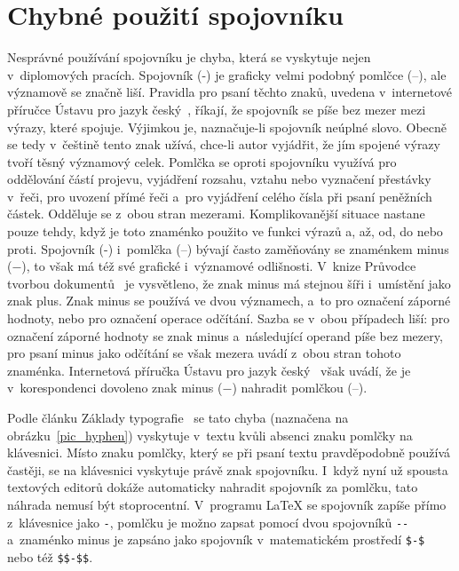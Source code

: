 \section{Chybné použití spojovníku}
Nesprávné používání spojovníku je chyba, která se vyskytuje nejen v~diplomových
pracích. Spojovník (-) je graficky velmi podobný pomlčce (--), ale významově
se značně liší. Pravidla pro psaní těchto znaků, uvedena v~internetové příručce
Ústavu pro jazyk český~\cite[Sekce: \emph{Spojovník} a~\emph{Pomlčka}]{Ustav_pro_jazyk_cesky},
říkají, že spojovník se píše bez mezer mezi výrazy, které spojuje. Výjimkou
je, naznačuje-li spojovník neúplné slovo. Obecně se tedy v~češtině tento znak
užívá, chce-li autor vyjádřit, že jím spojené výrazy tvoří těsný významový
celek. Pomlčka se oproti spojovníku využívá pro oddělování částí projevu,
vyjádření rozsahu, vztahu nebo vyznačení přestávky v~řeči, pro uvození
přímé řeči a~pro vyjádření celého čísla při psaní peněžních částek.
Odděluje se z~obou stran mezerami. Komplikovanější situace nastane pouze
tehdy, když je toto znaménko použito ve funkci výrazů a, až, od, do nebo proti.
Spojovník (-) i~pomlčka (--) bývají často zaměňovány se znaménkem minus ($-$),
to však má též své grafické i~významové odlišnosti.
V~knize Průvodce tvorbou dokumentů~\cite[k.~19.24, s.~148--149]{Pruvodce_tvorbou_dokumentu}
je vysvětleno, že znak minus má stejnou
šíři i~umístění jako znak plus. Znak minus se používá ve dvou významech, a~to
pro označení záporné hodnoty, nebo pro označení operace odčítání. Sazba se v~obou
případech liší: pro označení záporné hodnoty se znak minus a~následující
operand píše bez mezery, pro psaní minus jako odčítání se však mezera uvádí
z~obou stran tohoto znaménka. Internetová příručka Ústavu pro jazyk
český~\cite[Sekce: \emph{Pomlčka}]{Ustav_pro_jazyk_cesky} 
však uvádí, že je v~korespondenci dovoleno
znak minus ($-$) nahradit pomlčkou (--).

Podle článku Základy typografie~\cite{Zaklady_typografie:Slezakova} se tato chyba (naznačena na
obrázku~\ref{pic_hyphen}) vyskytuje v~textu kvůli absenci znaku pomlčky na klávesnici.
Místo znaku pomlčky, který se při psaní textu pravděpodobně používá častěji,
se na klávesnici vyskytuje právě znak spojovníku. I~když nyní už spousta
textových editorů dokáže automaticky nahradit spojovník za pomlčku, tato náhrada
nemusí být stoprocentní. V~programu {\LaTeX} se spojovník zapíše přímo
z~klávesnice jako \verb|-|,
pomlčku je možno zapsat pomocí dvou spojovníků \verb|--| a~znaménko minus je
zapsáno jako spojovník v~matematickém prostředí \verb|$-$| nebo též \verb|$$-$$|.


